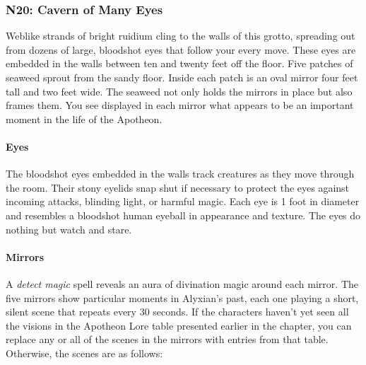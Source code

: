 \documentclass[a4paper, 11pt, bg=full, twocolumn, nooutline]{dndbook}
\begin{document}
\subsubsection{N20: Cavern of Many Eyes}

\begin{DndReadAloud}
Weblike strands of bright ruidium cling to the walls of this grotto, spreading out from dozens of large, bloodshot eyes that follow your every move. These eyes are embedded in the walls between ten and twenty feet off the floor.
Five patches of seaweed sprout from the sandy floor. Inside each patch is an oval mirror four feet tall and two feet wide. The seaweed not only holds the mirrors in place but also frames them. You see displayed in each mirror what appears to be an important moment in the life of the Apotheon.
\end{DndReadAloud}

\paragraph{Eyes}

The bloodshot eyes embedded in the walls track creatures as they move through the room. Their stony eyelids snap shut if necessary to protect the eyes against incoming attacks, blinding light, or harmful magic. Each eye is 1 foot in diameter and resembles a bloodshot human eyeball in appearance and texture. The eyes do nothing but watch and stare.

\paragraph{Mirrors}

A \textit{detect magic} spell reveals an aura of divination magic around each mirror. The five mirrors show particular moments in Alyxian's past, each one playing a short, silent scene that repeats every 30 seconds. If the characters haven't yet seen all the visions in the Apotheon Lore table presented earlier in the chapter, you can replace any or all of the scenes in the mirrors with entries from that table. Otherwise, the scenes are as follows:
\end{document}
